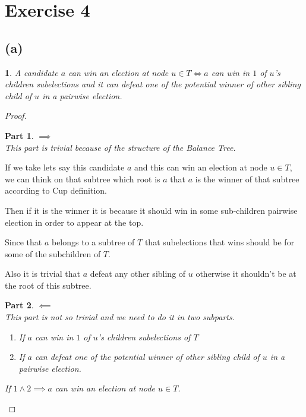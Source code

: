 \documentclass[12pt, a4paper]{article}
\begin{document}
\section{Exercise 4}
\subsection{(a)}
\newtheorem{case_a}{}
\newtheorem{proofpart_a}{Part}
\begin{case_a}
  A candidate $a$ can win an election at node $u \in T \iff a$ can win in $1$ of $u$'s children subelections and it can defeat one 
  of the potential winner of other sibling child of $u$ in a pairwise election.
\end{case_a}

\begin{proof}
  \begin{proofpart_a}
  $\implies$\\
  This part is trivial because of the structure of the Balance Tree.
  \end{proofpart_a}

  If we take lets say this candidate $a$ and this can win an election at node $u \in T$, we can think on that subtree which root is $a$ that $a$ is the winner of that subtree according to Cup definition.

  Then if it is the winner it is because it should win in some sub-children pairwise election in order to appear at the top.

  Since that $a$ belongs to a subtree of $T$ that subelections that wins should be for some of the subchildren of $T$.

  Also it is trivial that $a$ defeat any other sibling of $u$ otherwise it shouldn't be at the root of this subtree.
  
  \begin{proofpart_a}
  $\impliedby$\\
  This part is not so trivial and we need to do it in two subparts.\\
  \begin{enumerate}
    \item If $a$ can win in $1$ of $u$'s children subelections of $T$
    \item If $a$ can defeat one of the potential winner of other sibling child of $u$ in a pairwise election.
  \end{enumerate}
  If $1 \land 2 \implies a$ can win an election at node $u \in T$.
  \end{proofpart_a}


\end{proof}
\end{document}
